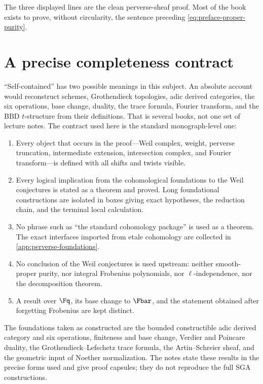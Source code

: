 The three displayed lines are the clean perverse-sheaf proof.  Most of the
book exists to prove, without circularity, the sentence preceding
\eqref{eq:preface-proper-purity}.

\section*{A precise completeness contract}

“Self-contained” has two possible meanings in this subject.  An absolute
account would reconstruct schemes, Grothendieck topologies, adic derived
categories, the six operations, base change, duality, the trace formula,
Fourier transform, and the BBD \(t\)-structure from their definitions.  That is
several books, not one set of lecture notes.  The contract used here is the
standard monograph-level one:

\begin{enumerate}
\item Every object that occurs in the proof---Weil complex, weight,
      perverse truncation, intermediate extension, intersection complex, and
      Fourier transform---is defined with all shifts and twists visible.
\item Every logical implication from the cohomological foundations to the
      Weil conjectures is stated as a theorem and proved.  Long foundational
      constructions are isolated in boxes giving exact hypotheses, the
      reduction chain, and the terminal local calculation.
\item No phrase such as “the standard cohomology package” is used as a
      theorem.  The exact interfaces imported from etale cohomology are
      collected in \cref{app:perverse-foundations}.
\item No conclusion of the Weil conjectures is used upstream: neither
      smooth-proper purity, nor integral Frobenius polynomials, nor
      \(\ell\)-independence, nor the decomposition theorem.
\item A result over \(\Fq\), its base change to \(\Fbar\), and the statement
      obtained after forgetting Frobenius are kept distinct.
\end{enumerate}

The foundations taken as constructed are the bounded constructible adic
derived category and six operations, finiteness and base change, Verdier and
Poincare duality, the Grothendieck--Lefschetz trace formula, the
Artin--Schreier sheaf, and the geometric input of Noether normalization.  The
notes state these results in the precise forms used and give proof capsules;
they do not reproduce the full SGA constructions.

